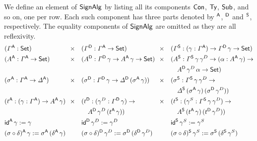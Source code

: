 \documentclass[a4paper,UKenglish,cleveref, autoref]{lipics-v2019}
\begin{document}
\begin{definition}\label{def:ads}
  We define an element of $\SignAlg$ by listing all its components
  $\Con$, $\Ty$, $\Sub$, and so on, one per row. Each such component
  has three parts denoted by $^\A$, $^\D$ and $^\S$, respectively. The
  equality components of $\SignAlg$ are omitted as they are all
  reflexivity.
  \begin{alignat*}{10}
    & (\GG^\A:\Set) && \hspace{-0.3em}\times && (\GG^\D:\GG^\A\ra\Set) && \hspace{-0.3em}\times && (\GG^\S:(\gamma:\GG^\A)\ra\GG^\D\,\gamma\ra\Set) \\
    & (A^\A:\GG^\A\ra\Set) && \hspace{-0.3em}\times && (A^\D:\GG^\D\,\gamma\ra A^\A\,\gamma\ra\Set) && \hspace{-0.3em}\times && (A^\S:\GG^\S\,\gamma\,\gamma^D\ra(\alpha:A^\A\,\gamma)\ra \\
    & && && && && \hspace{1em} A^\D\,\gamma^D\,\alpha\ra\Set) \\
    & (\sigma^\A:\GG^\A\ra\GD^\A) && \hspace{-0.3em}\times && (\sigma^\D:\GG^\D\,\gamma\ra\GD^\D\,(\sigma^\A\,\gamma)) && \hspace{-0.3em}\times && (\sigma^\S:\GG^\S\,\gamma\,\gamma^D\ra \\
    & && && && && \hspace{1em} \GD^\S\,(\sigma^\A\,\gamma)\,(\sigma^\D\,\gamma^D)) \\
    & (t^\A:(\gamma:\GG^\A)\ra A^\A\,\gamma) && \hspace{-0.3em}\times && (t^\D:(\gamma^D:\GG^\D\,\gamma)\ra && \hspace{-0.3em}\times && (t^\S:(\gamma^S:\GG^\S\,\gamma\,\gamma^D)\ra \\
    & && && \hspace{1em} A^\D\,\gamma^D\,(t^\A\,\gamma)) && && \hspace{1em}  A^\S\,(t^\A\,\gamma)\,(t^\D\,\gamma^D)) \\
    & \id^\A\,\gamma := \gamma && && \id^\D\,\gamma^D:=\gamma^D && && \id^\S\,\gamma^S := \gamma^S \\
    & (\sigma\circ\delta)^\A\,\gamma := \sigma^\A\,(\delta^\A\,\gamma) && && (\sigma\circ\delta)^\D\,\gamma^D := \sigma^\D\,(\delta^\D\,\gamma^D) && && (\sigma\circ\delta)^\S\,\gamma^S := \sigma^\S\,(\delta^\S\,\gamma^S) \\

\end{alignat*}
\end{definition}
\end{document}
